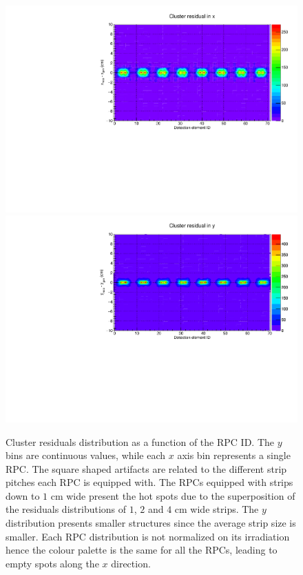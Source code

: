 \begin{figure}[]
\begin{center}
\includegraphics[width=0.99\linewidth]{Chapters/O2/Figs/CRx.pdf}
\includegraphics[width=0.99\linewidth]{Chapters/O2/Figs/CRy.pdf}
\caption{Cluster residuals distribution as a function of the RPC ID. The $y$ bins are continuous values, while each $x$ axis bin represents a single RPC. The square shaped artifacts are related to the different strip pitches each RPC is equipped with. The RPCs equipped with strips down to $1$ cm wide present the hot spots due to the superposition of the residuals distributions of $1$, $2$ and $4$ cm wide strips. The $y$ distribution presents smaller structures since the average strip size is smaller. Each RPC distribution is not normalized on its irradiation hence the colour palette is the same for all the RPCs, leading to empty spots along the $x$ direction.}
\label{fig:MID_CR}
\end{center}
\end{figure}

